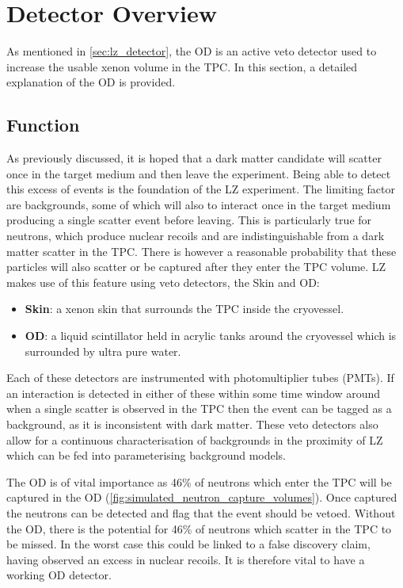 \section{Detector Overview} \label{OD_detector_overview}
\par
As mentioned in \autoref{sec:lz_detector}, the OD is an active veto detector used to increase the usable xenon volume in the TPC.
In this section, a detailed explanation of the OD is provided.

\subsection{Function}
\par
As previously discussed, it is hoped that a dark matter candidate will scatter once in the target medium and then leave the experiment.
Being able to detect this excess of events is the foundation of the LZ experiment.
The limiting factor are backgrounds, some of which will also to interact once in the target medium producing a single scatter event before leaving.
This is particularly true for neutrons, which produce nuclear recoils and are indistinguishable from a dark matter scatter in the TPC.
There is however a reasonable probability that these particles will also scatter or be captured after they enter the TPC volume.
LZ makes use of this feature using veto detectors, the Skin and OD:
\begin{itemize}
    \item \textbf{Skin}: a xenon skin that surrounds the TPC inside the cryovessel.
    \item \textbf{OD}: a liquid scintillator held in acrylic tanks around the cryovessel which is surrounded by ultra pure water.
\end{itemize}
Each of these detectors are instrumented with photomultiplier tubes (PMTs).
If an interaction is detected in either of these within some time window around when a single scatter is observed in the TPC then the event can be tagged as a background, as it is inconsistent with dark matter.
These veto detectors also allow for a continuous characterisation of backgrounds in the proximity of LZ which can be fed into parameterising background models.

\par
The OD is of vital importance as 46\% of neutrons which enter the TPC will be captured in the OD (\autoref{fig:simulated_neutron_capture_volumes}).
Once captured the neutrons can be detected and flag that the event should be vetoed. 
Without the OD, there is the potential for 46\% of neutrons which scatter in the TPC to be missed.
In the worst case this could be linked to a false discovery claim, having observed an excess in nuclear recoils.
It is therefore vital to have a working OD detector.

